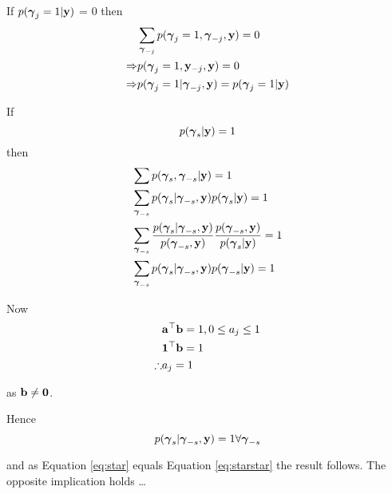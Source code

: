 \documentclass{amsart}[12pt]
\theoremstyle{definition}
\begin{document}
If $p({\boldsymbol \gamma}_j = 1|{\bf y})$ = 0
then
\begin{align*}
	            & \sum_{{\boldsymbol \gamma}_{-j}} p({\boldsymbol \gamma}_j=1, {\boldsymbol \gamma}_{-j}, {\bf y}) = 0 \\
	\Rightarrow & p({\boldsymbol \gamma}_j = 1, {\bf y}_{-j}, {\bf y}) = 0                       \\
	\Rightarrow & p({\boldsymbol \gamma}_j = 1| {\boldsymbol \gamma}_{-j}, {\bf y}) = p({\boldsymbol \gamma}_j=1|{\bf y})  \\
\end{align*}

If 
\begin{equation}\label{eq:star}
	p({\boldsymbol \gamma}_s|{\bf y}) = 1
\end{equation}
then
\begin{align*}
	  & \sum p({\boldsymbol \gamma}_s, {\boldsymbol \gamma}_{-s}|{\bf y}) = 1                                                                                            \\
	  & \sum_{{\boldsymbol \gamma}_{-s}} p({\boldsymbol \gamma}_s|{\boldsymbol \gamma}_{-s}, {\bf y}) p({\boldsymbol \gamma}_s|{\bf y}) = 1                                                            \\
	  & \sum_{{\boldsymbol \gamma}_{-s}} \frac{p({\boldsymbol \gamma}_s|{\boldsymbol \gamma}_{-s}, {\bf y})}{p({\boldsymbol \gamma}_{-s}, {\bf y})} \frac{p({\boldsymbol \gamma}_{-s}, {\bf y})}{ p({\boldsymbol \gamma}_s|{\bf y})} = 1 \\
	  & \sum_{{\boldsymbol \gamma}_{-s}} p({\boldsymbol \gamma}_s|{\boldsymbol \gamma}_{-s}, {\bf y}) p({\boldsymbol \gamma}_{-s}|{\bf y}) = 1                                                         \\
\end{align*}

Now
\begin{align*}
	           & {\bf a}^\top {\bf b} = 1, 0 \leq a_j \leq 1 \\
	           & {\bf 1}^\top {\bf b} = 1                  \\
	\therefore & a_j = 1                             \\
\end{align*}

as ${\bf b} \ne {\bf0}$.

Hence
\begin{equation}\label{eq:starstar}
	p({\boldsymbol \gamma}_s|{\boldsymbol \gamma}_{-s}, {\bf y}) = 1 \forall {\boldsymbol\gamma}_{-s}
\end{equation}

and as Equation \ref{eq:star} equals Equation \ref{eq:starstar} the result follows. The opposite implication
holds \ldots



\end{document}
